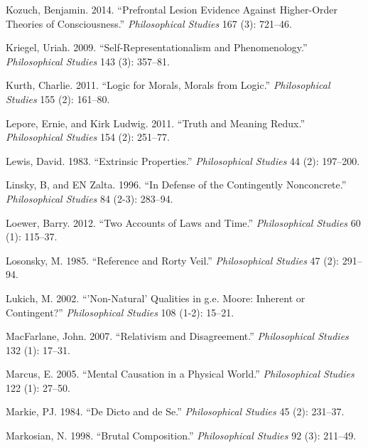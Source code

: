 \documentclass[
  10pt,
  letterpaper,
  DIV=11,
  numbers=noendperiod,
  twoside]{scrartcl}
\newlength{\cslhangindent}
\newenvironment{CSLReferences}[2] %
 {\begin{list}{}{%
  \setlength{\itemindent}{0pt}
  \setlength{\leftmargin}{0pt}
  \setlength{\parsep}{0pt}
  \ifodd #1
   \setlength{\leftmargin}{\cslhangindent}
   \setlength{\itemindent}{-1\cslhangindent}
  \fi
  \setlength{\itemsep}{#2\baselineskip}}}
 {\end{list}}
\begin{document}
\begin{CSLReferences}{1}{0}
Kozuch, Benjamin. 2014. {``Prefrontal Lesion Evidence Against
Higher-Order Theories of Consciousness.''} \emph{Philosophical Studies}
167 (3): 721--46.

Kriegel, Uriah. 2009. {``Self-Representationalism and Phenomenology.''}
\emph{Philosophical Studies} 143 (3): 357--81.

Kurth, Charlie. 2011. {``Logic for Morals, Morals from Logic.''}
\emph{Philosophical Studies} 155 (2): 161--80.

Lepore, Ernie, and Kirk Ludwig. 2011. {``Truth and Meaning Redux.''}
\emph{Philosophical Studies} 154 (2): 251--77.

Lewis, David. 1983. {``Extrinsic Properties.''} \emph{Philosophical
Studies} 44 (2): 197--200.

Linsky, B, and EN Zalta. 1996. {``In Defense of the Contingently
Nonconcrete.''} \emph{Philosophical Studies} 84 (2-3): 283--94.

Loewer, Barry. 2012. {``Two Accounts of Laws and Time.''}
\emph{Philosophical Studies} 60 (1): 115--37.

Losonsky, M. 1985. {``Reference and Rorty Veil.''} \emph{Philosophical
Studies} 47 (2): 291--94.

Lukich, M. 2002. {``'Non-Natural' Qualities in g.e. Moore: Inherent or
Contingent?''} \emph{Philosophical Studies} 108 (1-2): 15--21.

MacFarlane, John. 2007. {``Relativism and Disagreement.''}
\emph{Philosophical Studies} 132 (1): 17--31.

Marcus, E. 2005. {``Mental Causation in a Physical World.''}
\emph{Philosophical Studies} 122 (1): 27--50.

Markie, PJ. 1984. {``De Dicto and de Se.''} \emph{Philosophical Studies}
45 (2): 231--37.

Markosian, N. 1998. {``Brutal Composition.''} \emph{Philosophical
Studies} 92 (3): 211--49.


\end{CSLReferences}
\end{document}
